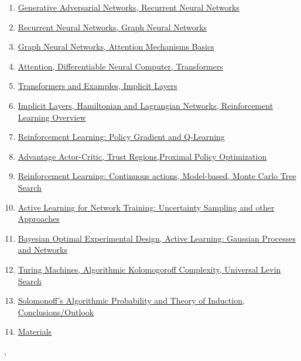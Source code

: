 \documentclass[11pt]{article}
\renewcommand{\today}{\shortmonthname[\the\month] \the \day,  \the\year}
\begin{document}
\begin{enumerate}
	\item \href{https://mp.weixin.qq.com/s/RbPXU8Es-ipy9bOt1zeKcA}{Generative Adversarial Networks, Recurrent Neural Networks}%
	\item \href{https://mp.weixin.qq.com/s/4VGsSCHsf2Jsp6WmaRivAw}{Recurrent Neural Networks, Graph Neural Networks}%
	\item \href{https://mp.weixin.qq.com/s/8kGlkNaP9rnTIcBE6d46aA}{Graph Neural Networks, Attention Mechanisms Basics}%
	\item \href{https://mp.weixin.qq.com/s/GvGFZBGskYBRd89KH1MvCg}{Attention, Differentiable Neural Computer, Transformers}%
	\item \href{https://mp.weixin.qq.com/s/jI3TAmtOXYaqy3U2nRN-gg}{Transformers and Examples, Implicit Layers}%
	\item \href{https://mp.weixin.qq.com/s/t0yu1kgJZplIHeoe_gzmeA}{Implicit Layers, Hamiltonian and Lagrangian Networks, Reinforcement Learning Overview}%
	\item \href{https://mp.weixin.qq.com/s/nnghVZXxebGAPPRU61wEXw}{Reinforcement Learning: Policy Gradient and Q-Learning}%
	\item \href{https://mp.weixin.qq.com/s/SK0vRxXBOLFTYe-75DL35g}{Advantage Actor-Critic, Trust Regions,Proximal Policy Optimization}%
	\item \href{https://mp.weixin.qq.com/s/XejVx34Xeu9MTbIENMuJJw}{Reinforcement Learning: Continuous actions, Model-based, Monte Carlo Tree Search}%
	\item \href{https://mp.weixin.qq.com/s/nG5CdFTxCK48HwxPLAKlUA}{Active Learning for Network Training: Uncertainty Sampling and other Approaches}%
	\item \href{https://mp.weixin.qq.com/s/jjAWohCS942dOftl4-RO5A}{Bayesian Optimal Experimental Design, Active Learning: Gaussian Processes and Networks}%
	\item \href{https://mp.weixin.qq.com/s/lBQL5RmAbNq2QuiHWl4YPA}{Turing Machines, Algorithmic Kolomogoroff Complexity, Universal Levin Search}%
	\item \href{https://mp.weixin.qq.com/s/aWXLGFTHQqYc0wGxARo2kA}{Solomonoff's Algorithmic Probability and Theory of Induction, Conclusions/Outlook}%
	\item \href{url}{Materials}
\end{enumerate}


%
\begin{flushright}
	\tiny \today 
\end{flushright}
\end{document}
